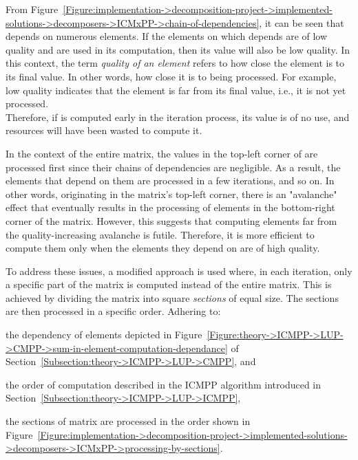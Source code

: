 From Figure~\ref{Figure:implementation->decomposition-project->implemented-solutions->decomposers->ICMxPP->chain-of-dependencies}, it can be seen that  depends on numerous elements.
If the elements on which  depends are of low quality and are used in its computation, then its value will also be low quality.
In this context, the term \textit{quality of an element} refers to how close the element is to its final value.
In other words, how close it is to being processed.
For example, low quality indicates that the element is far from its final value, i.e., it is not yet processed.\\
Therefore, if  is computed early in the iteration process, its value is of no use, and resources will have been wasted to compute it.

In the context of the entire matrix, the values in the top-left corner of  are processed first since their chains of dependencies are negligible.
As a result, the elements that depend on them are processed in a few iterations, and so on.
In other words, originating in the matrix's top-left corner, there is an "avalanche" effect that eventually results in the processing of elements in the bottom-right corner of the matrix.
However, this suggests that computing elements far from the quality-increasing avalanche is futile.
Therefore, it is more efficient to compute them only when the elements they depend on are of high quality.

To address these issues, a modified approach is used where, in each iteration, only a specific part of the matrix is computed instead of the entire matrix.
This is achieved by dividing the matrix into square \textit{sections} of equal size.
The sections are then processed in a specific order.
Adhering to:

\begin{tight_itemize}
	\item the dependency of elements depicted in Figure~\ref{Figure:theory->ICMPP->LUP->CMPP->sum-in-element-computation-dependance} of Section~\ref{Subsection:theory->ICMPP->LUP->CMPP}, and
	\item the order of computation described in the ICMPP algorithm introduced in Section~\ref{Subsection:theory->ICMPP->LUP->ICMPP},
\end{tight_itemize}

the sections of matrix  are processed in the order shown in Figure~\ref{Figure:implementation->decomposition-project->implemented-solutions->decomposers->ICMxPP->processing-by-sections}.

